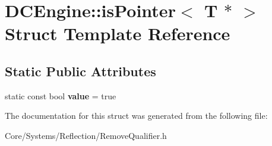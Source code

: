 \hypertarget{structDCEngine_1_1isPointer_3_01T_01_5_01_4}{\section{D\-C\-Engine\-:\-:is\-Pointer$<$ T $\ast$ $>$ Struct Template Reference}
\label{structDCEngine_1_1isPointer_3_01T_01_5_01_4}
}
\subsection*{Static Public Attributes}
\begin{DoxyCompactItemize}
\item 
\hypertarget{structDCEngine_1_1isPointer_3_01T_01_5_01_4_a703eea11045e87de200eaef97769f632}{static const bool {\bfseries value} = true}\label{structDCEngine_1_1isPointer_3_01T_01_5_01_4_a703eea11045e87de200eaef97769f632}

\end{DoxyCompactItemize}


The documentation for this struct was generated from the following file\-:\begin{DoxyCompactItemize}
\item 
Core/\-Systems/\-Reflection/Remove\-Qualifier.\-h\end{DoxyCompactItemize}
